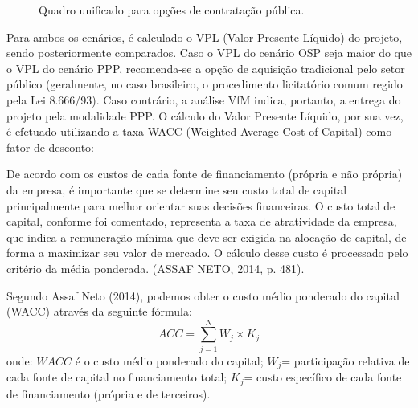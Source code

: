 \begin{figure}[ht!]
    \centering
    \caption{Quadro unificado para opções de contratação pública.}
    \label{fig:estrutura-de-impostos}
\end{figure}

Para ambos os cenários, é calculado o VPL (Valor Presente Líquido) do projeto, sendo posteriormente comparados. Caso o VPL do cenário OSP seja maior do que o VPL do cenário PPP, recomenda-se a opção de aquisição tradicional pelo setor público (geralmente, no caso brasileiro, o procedimento licitatório comum regido pela Lei 8.666/93). Caso contrário, a análise VfM indica, portanto, a entrega do projeto pela modalidade PPP. O cálculo do Valor Presente Líquido, por sua vez, é efetuado utilizando a taxa WACC (Weighted Average Cost of Capital) como fator de desconto:

\begin{citacao}
De acordo com os custos de cada fonte de financiamento (própria e não própria) da empresa, é importante que se determine seu custo total de capital principalmente para melhor orientar suas decisões financeiras. O custo total de capital, conforme foi comentado, representa a taxa de atratividade da empresa, que indica a remuneração mínima que deve ser exigida na alocação de capital, de forma a maximizar seu valor de mercado. O cálculo desse custo é processado pelo critério da média ponderada. (ASSAF NETO, 2014, p. 481).
\end{citacao}

Segundo Assaf Neto (2014), podemos obter o custo médio ponderado do capital (WACC) através da seguinte fórmula:
\begin{equation}
    ACC=\sum_{j=1}^{N}W_j\times K_j
\end{equation}
onde: $WACC$ é o custo médio ponderado do capital; $W_j$=	participação relativa de cada fonte de capital no financiamento total; $K_j$=	custo específico de cada fonte de financiamento (própria e de terceiros).

